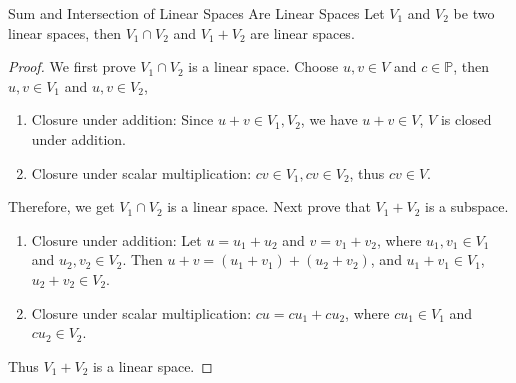 \begin{proposition}{Sum and Intersection of Linear Spaces Are Linear Spaces}{}
  Let $V_1$ and $V_2$ be two linear spaces,
  then $V_1 \cap V_2$ and $V_1 + V_2$ are linear spaces.
\end{proposition}

\begin{proof}
  We first prove $V_1 \cap V_2$ is a linear space.
  Choose $u, v \in V$ and $c \in \mathbb{P}$, then $u, v \in V_1$ and $u, v \in V_2$,
  \begin{enumerate}
  \item Closure under addition: Since $u + v \in V_1, V_2$, we have $u + v \in
    V$, $V$ is closed under addition.
  \item Closure under scalar multiplication: $c v \in V_1, c v \in V_2$,
    thus $c v \in V$.
  \end{enumerate}
  Therefore, we get $V_1 \cap V_2$ is a linear space.
  Next prove that $V_1 + V_2$ is a subspace.
  \begin{enumerate}
  \item Closure under addition: Let $u = u_1 + u_2$ and $v = v_1 + v_2$,
    where $u_1, v_1 \in V_1$ and $u_2, v_2 \in V_2$.
    Then $u + v = (u_1 + v_1) + (u_2 + v_2)$, and $u_1 + v_1 \in V_1$, $u_2 +
    v_2 \in V_2$.
  \item Closure under scalar multiplication: $cu = cu_1 + cu_2$,
    where $cu_1 \in V_1$ and $cu_2 \in V_2$.
  \end{enumerate}
  Thus $V_1 + V_2$ is a linear space.
\end{proof}

